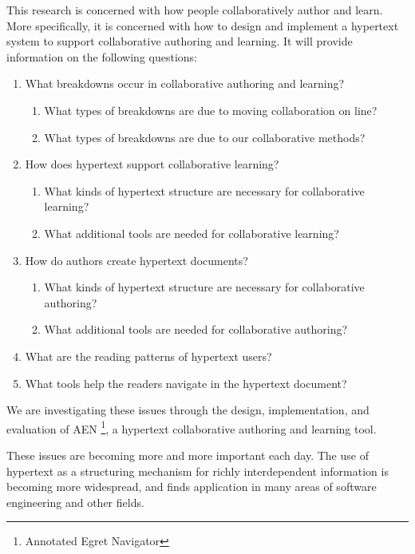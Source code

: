 This research is concerned with how people collaboratively author and
learn.  More specifically, it is concerned with how to design and implement
a hypertext system to support collaborative authoring and learning. It will
provide information on the following questions:\begin{enumerate}
\item{What breakdowns occur in collaborative authoring and learning?}
  \begin{enumerate}
  \item{What types of breakdowns are due to moving collaboration on line?}
  \item{What types of breakdowns are due to our collaborative methods?}
  \end{enumerate} 
\item{How does hypertext support collaborative learning?}
  \begin{enumerate}
  \item{What kinds of hypertext structure are necessary for collaborative learning?}
  \item{What additional tools are needed for collaborative learning?}
  \end{enumerate} 
\item{How do authors create hypertext documents?}
  \begin{enumerate}
  \item{What kinds of hypertext structure are necessary for collaborative authoring?}
  \item{What additional tools are needed for collaborative authoring?}
  \end{enumerate} 
\item{What are the reading patterns of hypertext users?}
\item{What tools help the readers navigate in the hypertext document?}
\end{enumerate}

We are investigating these issues through the design, implementation, and
evaluation of AEN \footnote{Annotated Egret Navigator}, a hypertext collaborative authoring and learning tool.

These issues are becoming more and more important each day.  The use of
hypertext as a structuring mechanism for richly interdependent information
is becoming more widespread, and finds application in many areas of
software engineering and other fields.

